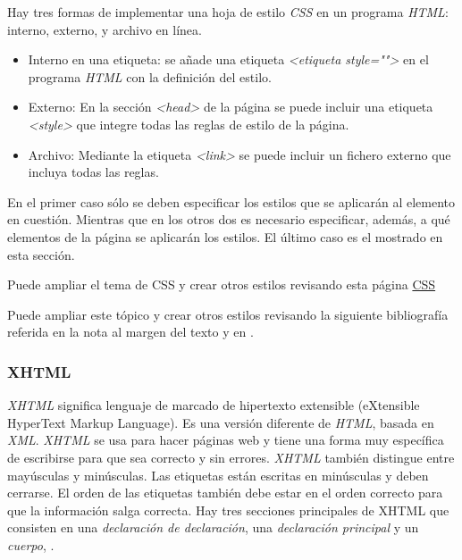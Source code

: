  Hay tres formas de implementar una hoja de estilo \textit{CSS} en un programa \textit{HTML}: interno, externo, y archivo en línea. 
\begin{itemize}
	\item Interno en una etiqueta: se añade una etiqueta \textit{<etiqueta style="">} en el programa \textit{HTML} con la definición del estilo. 
	\item Externo: En la sección \textit{<head>} de la página se puede incluir una etiqueta \textit{<style>} que integre todas las reglas de estilo de la página.
	\item Archivo: Mediante la etiqueta \textit{<link>} se puede incluir un fichero externo que incluya todas las reglas.
\end{itemize}
 
 
 En el primer caso sólo se deben especificar los estilos que se aplicarán al elemento en cuestión. Mientras que en los otros dos es necesario especificar, además, a qué elementos de la página se aplicarán los estilos. El último caso es el  mostrado en esta sección. 
 
  
 
 \begin{tcolorbox}
 	[colback=red!5!white,colframe=red!75!black,fonttitle=\bfseries,title=CSS]
 		Puede ampliar el tema de CSS y crear otros estilos revisando esta página  \href{https://www.w3.org/Style/CSS/}{CSS}
 \end{tcolorbox}
 
 Puede ampliar  este tópico y crear otros estilos revisando la siguiente bibliografía referida en la nota al margen del texto y en \cite{DuRocher2021,Shaw2017}.
 

 
\subsubsection{XHTML} 

\textit{XHTML} significa lenguaje de marcado de hipertexto extensible (eXtensible HyperText Markup Language). Es una versión diferente de \textit{HTML}, basada en \textit{XML}. \textit{XHTML} se usa para hacer páginas web y tiene una forma muy específica de escribirse para que sea correcto y sin errores. \textit{XHTML} también distingue entre mayúsculas y minúsculas. Las etiquetas están escritas en minúsculas y deben cerrarse. El orden de las etiquetas también debe estar en el orden correcto para que la información salga correcta. Hay tres secciones principales de XHTML que consisten en una \textit{declaración de declaración}, una \textit{declaración principal} y un \textit{cuerpo}, \cite{Pfaffenberger2004,Musciano2002}.

